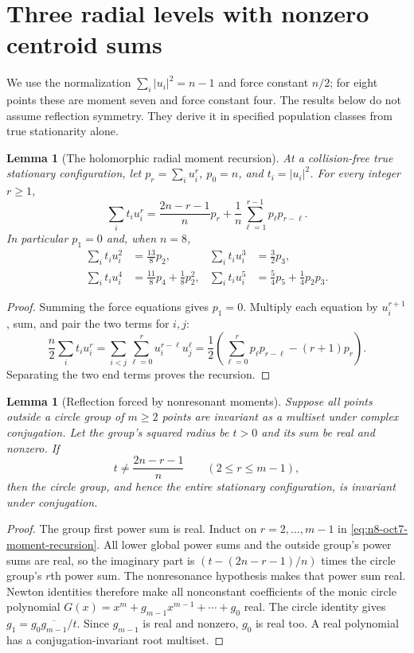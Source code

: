 \documentclass[11pt]{article}
\newtheorem{lemma}[theorem]{Lemma}
\theoremstyle{remark}
\numberwithin{equation}{section}
\begin{document}
\section{Three radial levels with nonzero centroid sums}
\label{sec:n8-oct7-three-levels}

We use the normalization $\sum_i|u_i|^2=n-1$ and force constant
$n/2$; for eight points these are moment seven and force constant four.
The results below do not assume reflection symmetry. They derive it
in specified population classes from true stationarity alone.

\begin{lemma}[The holomorphic radial moment recursion]
\label{lem:n8-oct7-moment-recursion}
At a collision-free true stationary configuration, let
$p_r=\sum_i u_i^r$, $p_0=n$, and $t_i=|u_i|^2$. For every integer
$r\ge1$,
\begin{equation}\label{eq:n8-oct7-moment-recursion}
 \sum_i t_i u_i^r
 =\frac{2n-r-1}{n}p_r+
   \frac1n\sum_{\ell=1}^{r-1}p_\ell p_{r-\ell}.
\end{equation}
In particular $p_1=0$ and, when $n=8$,
\begin{align*}
 \sum_i t_i u_i^2&=\frac{13}{8}p_2,
 &\sum_i t_i u_i^3&=\frac32p_3,\\
 \sum_i t_i u_i^4&=\frac{11}{8}p_4+\frac18p_2^2,
 &\sum_i t_i u_i^5&=\frac54p_5+\frac14p_2p_3.
\end{align*}
\end{lemma}
\begin{proof}
Summing the force equations gives $p_1=0$. Multiply each equation
by $u_i^{r+1}$, sum, and pair the two terms for $i,j$:
\[
 \frac n2\sum_i t_i u_i^r
 =\sum_{i<j}\sum_{\ell=0}^r u_i^{r-\ell}u_j^\ell
 =\frac12\left(\sum_{\ell=0}^r p_\ell p_{r-\ell}
                         -(r+1)p_r\right).
\]
Separating the two end terms proves the recursion.
\end{proof}

\begin{lemma}[Reflection forced by nonresonant moments]
\label{lem:n8-oct7-reflection}
Suppose all points outside a circle group of $m\ge2$ points are invariant
as a multiset under complex conjugation. Let the group's squared
radius be $t>0$ and its sum be real and nonzero. If
\[
            t\ne\frac{2n-r-1}{n}\qquad(2\le r\le m-1),
\]
then the circle group, and hence the entire stationary configuration,
is invariant under conjugation.
\end{lemma}
\begin{proof}
The group first power sum is real. Induct on $r=2,\ldots,m-1$ in
\eqref{eq:n8-oct7-moment-recursion}. All lower global power sums and
the outside group's power sums are real, so the imaginary part is
$(t-(2n-r-1)/n)$ times the circle group's $r$th power sum. The
nonresonance hypothesis makes that power sum real. Newton identities
therefore make all nonconstant coefficients of the monic circle
polynomial $G(x)=x^m+g_{m-1}x^{m-1}+\cdots+g_0$ real.
The circle identity gives
$g_1=g_0\overline{g_{m-1}}/t$. Since $g_{m-1}$ is real and nonzero,
$g_0$ is real too. A real polynomial has a conjugation-invariant
root multiset.
\end{proof}
\end{document}

